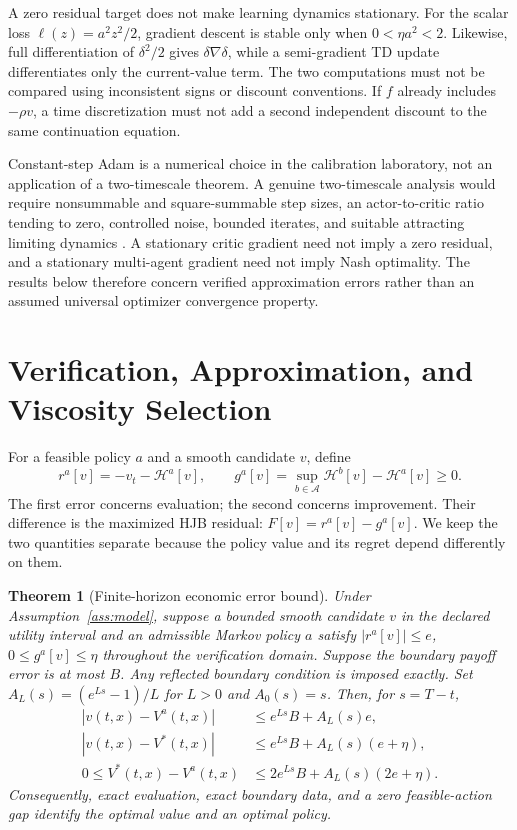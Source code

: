 \documentclass[ecta,nameyear,draft]{econsocart}
\newtheorem{theorem}{Theorem}
\theoremstyle{definition}
\theoremstyle{remark}
\newcommand{\HH}{\mathcal H}
\newcommand{\Act}{\mathcal A}
\begin{document}
A zero residual target does not make learning dynamics stationary. For the scalar loss $\ell(z)=a^2z^2/2$, gradient descent is stable only when $0<\eta a^2<2$. Likewise, full differentiation of $\delta^2/2$ gives $\delta\nabla\delta$, while a semi-gradient TD update differentiates only the current-value term. The two computations must not be compared using inconsistent signs or discount conventions. If $f$ already includes $-\rho v$, a time discretization must not add a second independent discount to the same continuation equation.

Constant-step Adam is a numerical choice in the calibration laboratory, not an application of a two-timescale theorem. A genuine two-timescale analysis would require nonsummable and square-summable step sizes, an actor-to-critic ratio tending to zero, controlled noise, bounded iterates, and suitable attracting limiting dynamics \citep{borkar2024}. A stationary critic gradient need not imply a zero residual, and a stationary multi-agent gradient need not imply Nash optimality. The results below therefore concern verified approximation errors rather than an assumed universal optimizer convergence property.




\section{Verification, Approximation, and Viscosity Selection}\label{sec:theory}
For a feasible policy $a$ and a smooth candidate $v$, define
\begin{equation}\label{eq:errors}
 r^a[v]=-v_t-\HH^a[v],\qquad
 g^a[v]=\sup_{b\in\Act}\HH^b[v]-\HH^a[v]\geq0.
\end{equation}
The first error concerns evaluation; the second concerns improvement. Their difference is the maximized HJB residual: $F[v]=r^a[v]-g^a[v]$. We keep the two quantities separate because the policy value and its regret depend differently on them.

\begin{theorem}[Finite-horizon economic error bound]\label{thm:verification}
Under Assumption~\ref{ass:model}, suppose a bounded smooth candidate $v$ in the declared utility interval and an admissible Markov policy $a$ satisfy $|r^a[v]|\leq e$, $0\leq g^a[v]\leq\eta$ throughout the verification domain. Suppose the boundary payoff error is at most $B$. Any reflected boundary condition is imposed exactly. Set $A_L(s)=(e^{Ls}-1)/L$ for $L>0$ and $A_0(s)=s$. Then, for $s=T-t$,
\begin{align}
 |v(t,x)-V^a(t,x)|&\leq e^{Ls}B+A_L(s)e,\label{eq:policybound}\\
 |v(t,x)-V^*(t,x)|&\leq e^{Ls}B+A_L(s)(e+\eta),\label{eq:valuebound}\\
 0\leq V^*(t,x)-V^a(t,x)&\leq2e^{Ls}B+A_L(s)(2e+\eta).\label{eq:regret}
\end{align}
Consequently, exact evaluation, exact boundary data, and a zero feasible-action gap identify the optimal value and an optimal policy.
\end{theorem}
\end{document}
